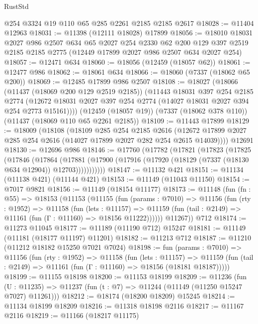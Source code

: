 \begin{lexlean}{RustStd}
\begin{coremodule}
    @254
    @3324
    @19
    @110
    @65
    @285
    @2261
    @2185
    @2185
    @2617
@18028 := @11404 @12963
@18031 := @11398 (@12111 @18028) @17899
@18056 := @18010
    @18031
    @2027
    @986
    @2507
    @634
    @65
    @2027
    @254
    @2330
    @62
    @200
    @129
    @397
    @2519
    @2185
    @2185
    @2775
    (@12449 @17899 @2027 @986 @2507 @634 @2027 @254)
@18057 := @12471 @634
@18060 := @18056 (@12459 (@18057 @62))
@18061 := @12477 @986
@18062 := @18061 @634
@18066 := @18060 (@7337 (@18062 @65 @200))
@18069 := @12485 @17899 @986 @2507
@18108 := @18027
    (@18066
      (@11437 (@18069 @200 @129 @2519 @2185))
      (@11443
        @18031
        @397
        @254
        @2185
        @2774
        (@12672 @18031 @2027 @397 @254 @2774 (@14027 @18031 @2027 @394 @254 @2773 @15161))))
    (@12459 (@18057 @19))
    (@7337 (@18062 @378 @110))
    (@11437 (@18069 @110 @65 @2261 @2185))
@18109 := @11443 @17899
@18129 := @18009
    (@18108
      (@18109
        @285
        @254
        @2185
        @2616
        (@12672 @17899 @2027 @285 @254 @2616 (@14027 @17899 @2027 @282 @254 @2615 @14039))))
    @12691
@18130 := @12696 @986
@18146 := @17760
    (@17782
      (@17821
        (@17823
          (@17825
            (@17846
              (@17864
                (@17881
                  (@17900 (@17916 (@17920 (@18129 (@7337 (@18130 @634 @12904)) @12703)))))))))))
@18147 := @11132 @421
@18151 := @11134 (@11138 @421) (@11144 @421)
@18153 := @11149 (@11043 @11150)
@18154 := @7017 @9821
@18156 := @11149 (@18154 @11177)
@18173 := @11148
    (fun (fn : @55) =>
    @18153
      (@11153
        (@11155
          (fun (params : @7010) =>
          @11156
            (fun (rty : @1952) =>
            @11158
              (fun (lets : @11157) =>
              @11159 (fun (tail : @2149) => @11161 (fun (Γ : @11160) => @18156 @11222))))))
        @11267))
    @712
@18174 := @11273 @11045
@18177 := @11189 (@11190 @712) @15247
@18181 := @11149 (@11181 (@18177 @11197) @11201)
@18182 := @11213 @712
@18187 := @11210 (@11212 @18182 @15250 @7021 @7024)
@18198 := fun (params : @7010) =>
  @11156
    (fun (rty : @1952) =>
    @11158
      (fun (lets : @11157) =>
      @11159 (fun (tail : @2149) => @11161 (fun (Γ : @11160) => @18156 (@18181 @18187)))))
@18199 := @11155 @18198
@18200 := @11153 @18199
@18209 := @11236
    (fun (U : @11235) => @11237 (fun (t : @7) => @11244 (@11149 (@11250 @15247 @7027) @11261)))
@18212 := @18174 (@18200 @18209) @15245
@18214 := @11134 @18199 @18209
@18216 := @11318 @18198 @2116
@18217 := @11167 @2116
@18219 := @11166 (@18217 @11175)

\end{coremodule}
\end{lexlean}
